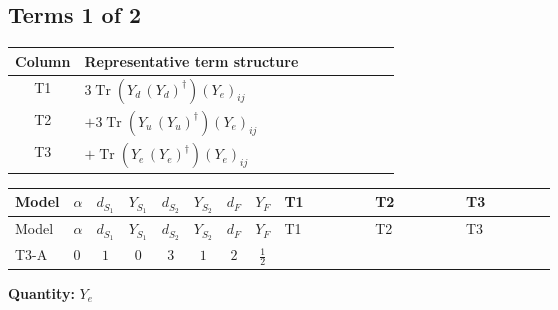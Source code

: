 \documentclass[8pt]{article}
\begin{document}
\begin{landscape}
\subsection*{Terms 1 of 2}
\begin{center}
\begin{tabular}{@{}c >{\raggedright\arraybackslash}p{0.82\linewidth}@{}}
\toprule
Column & Representative term structure \\
\midrule
T1 & \(\displaystyle 3 \operatorname{Tr}\!\left({Y_d}\,\left({Y_d}\right)^{\dagger}\right) \left({Y_e}\right)_{ij}\) \\
\midrule
T2 & \(\displaystyle +3 \operatorname{Tr}\!\left({Y_u}\,\left({Y_u}\right)^{\dagger}\right) \left({Y_e}\right)_{ij}\) \\
\midrule
T3 & \(\displaystyle +\operatorname{Tr}\!\left({Y_e}\,\left({Y_e}\right)^{\dagger}\right) \left({Y_e}\right)_{ij}\) \\
\midrule
\bottomrule
\end{tabular}
\end{center}
\smallskip
\tiny
\begin{longtable}{@{}llcccccc >{\raggedright\arraybackslash}p{0.21\linewidth} >{\raggedright\arraybackslash}p{0.21\linewidth} >{\raggedright\arraybackslash}p{0.21\linewidth}@{}}
\toprule
Model & $\alpha$ & $d_{S_1}$ & $Y_{S_1}$ & $d_{S_2}$ & $Y_{S_2}$ & $d_F$ & $Y_F$ & T1 & T2 & T3 \\
\midrule
\endfirsthead
\toprule
Model & $\alpha$ & $d_{S_1}$ & $Y_{S_1}$ & $d_{S_2}$ & $Y_{S_2}$ & $d_F$ & $Y_F$ & T1 & T2 & T3 \\
\midrule
\endhead
T3-A & $0$ & $1$ & $0$ & $3$ & $1$ & $2$ & $\frac{1}{2}$ & \scriptsize\adjustbox{max width=\linewidth}{$\begin{gathered} 3 \operatorname{Tr}\!\left({Y_d}\,\left({Y_d}\right)^{\dagger}\right) \left({Y_e}\right)_{ij}\end{gathered}$} & \scriptsize\adjustbox{max width=\linewidth}{$\begin{gathered} +3 \operatorname{Tr}\!\left({Y_u}\,\left({Y_u}\right)^{\dagger}\right) \left({Y_e}\right)_{ij}\end{gathered}$} & \scriptsize\adjustbox{max width=\linewidth}{$\begin{gathered} +\operatorname{Tr}\!\left({Y_e}\,\left({Y_e}\right)^{\dagger}\right) \left({Y_e}\right)_{ij}\end{gathered}$} \\
\midrule
\bottomrule
\end{longtable}
\clearpage
\noindent\textbf{Quantity: }$Y_e$\par\smallskip

\end{landscape}
\end{document}
